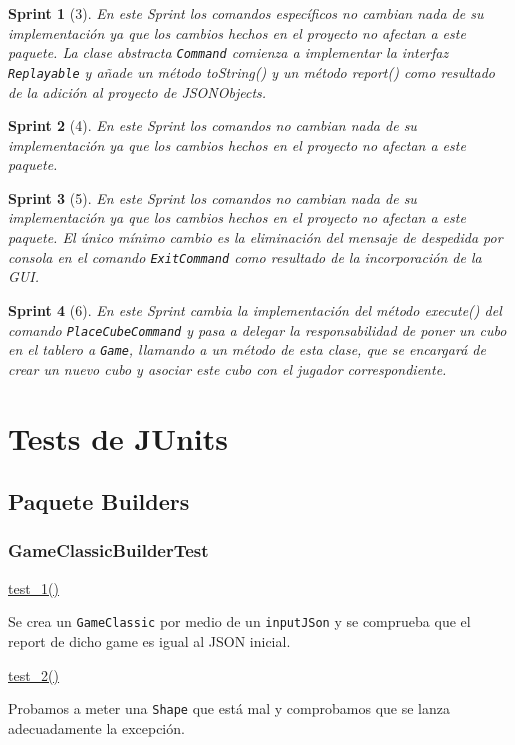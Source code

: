 \documentclass[12pt,a4paper,openright]{book}
\theoremstyle{break}
\newtheorem*{sprint}{Sprint}
\begin{document}
\begin{sprint}[3]
En este Sprint los comandos específicos no cambian nada de su implementación ya que los cambios hechos en el proyecto no afectan a este paquete. La clase abstracta \texttt{Command} comienza a implementar la interfaz \texttt{Replayable} y añade un método toString() y un método report() como resultado de la adición al proyecto de JSONObjects.
\end{sprint}

\begin{sprint}[4]
En este Sprint los comandos no cambian nada de su implementación ya que los cambios hechos en el proyecto no afectan a este paquete.
\end{sprint}

\begin{sprint}[5]
En este Sprint los comandos no cambian nada de su implementación ya que los cambios hechos en el proyecto no afectan a este paquete. El único mínimo cambio es la eliminación del mensaje de despedida por consola en el comando \texttt{ExitCommand} como resultado de la incorporación de la GUI.
\end{sprint}

\begin{sprint}[6]
En este Sprint cambia la implementación del método execute() del comando \texttt{PlaceCubeCommand} y pasa a delegar la responsabilidad de poner un cubo en el tablero a \texttt{Game}, llamando a un método de esta clase, que se encargará de crear un nuevo cubo y asociar este cubo con el jugador correspondiente.
\end{sprint}

\chapter{Tests de JUnits}
\section{Paquete Builders}
\subsection{GameClassicBuilderTest}
\underline{test\_1()}

Se crea un \texttt{GameClassic} por medio de un \texttt{inputJSon} y se comprueba que el report de dicho game es igual al JSON inicial.

\underline{test\_2()}

Probamos a meter una \texttt{Shape} que está mal y comprobamos que se lanza adecuadamente la excepción.
\end{document}
